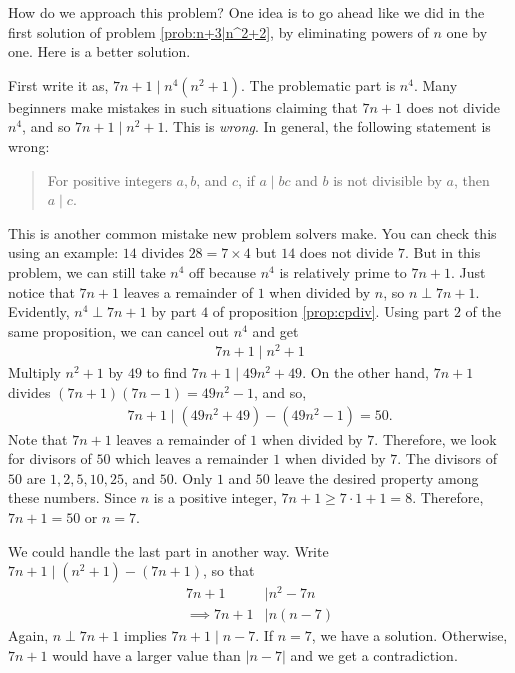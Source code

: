 	\begin{solution}
		How do we approach this problem? One idea is to go ahead like we did in the first solution of problem \eqref{prob:n+3|n^2+2}, by eliminating powers of $n$ one by one. Here is a better solution.

		First write it as, $7n+1 \mid n^4(n^2+1)$. The problematic part is $n^4$. Many beginners make mistakes in such situations claiming that $7n+1$ does not divide $n^4$, and so $7n+1 \mid n^2+1$. This is \textit{wrong}. In general, the following statement is wrong:
		\begin{quote}
			For positive integers $a,b$, and $c$, if $a\mid bc$ and $b$ is not divisible by $a$, then $a\mid c$.
		\end{quote}
		This is another common  mistake new problem solvers make. You can check this using an example: $14$ divides $28=7\times4$ but $14$ does not divide $7$. But in this problem, we can still take $n^4$ off because $n^4$ is relatively prime to $7n+1$. Just notice that $7n+1$ leaves a remainder of $1$ when divided by $n$, so $n\perp7n+1$. Evidently, $n^4\perp7n+1$ by part $4$ of proposition \eqref{prop:cpdiv}. Using part $2$ of the same proposition, we can cancel out $n^4$ and get
			\begin{align*}
				7n+1  \mid n^2+1
			\end{align*}
		Multiply $n^2+1$ by $49$ to find $ 7n+1 \mid 49n^2+49$. On the other hand, $7n+1$ divides $(7n+1)(7n-1)=49n^2-1$, and so,
			\begin{align*}
				7n+1 \mid (49n^2+49)-(49n^2-1) = 50.
			\end{align*}
		Note that $7n+1$ leaves a remainder of $1$ when divided by $7$. Therefore, we look for divisors of $50$ which leaves a remainder $1$ when divided by $7$. The divisors of $50$ are $1,2,5,10,25$, and $50$. Only $1$ and $50$ leave the desired property among these numbers. Since $n$ is a positive integer, $7n+1\geq7\cdot1+1=8$. Therefore, $7n+1=50$ or $n=7$.
	\end{solution}

	\begin{remark}
		We could handle the last part in another way. Write $7n+1\mid (n^2+1)-(7n+1)$, so that
			\begin{align*}
				7n+1
					& \mid n^2-7n\\
				\implies 7n+1
					& \mid  n(n-7)
			\end{align*}
		Again, $n\perp7n+1$ implies $7n+1\mid n-7$. If $n=7$, we have a solution. Otherwise, $7n+1$ would have a larger value than $|n-7|$ and we get a contradiction.
	\end{remark}

